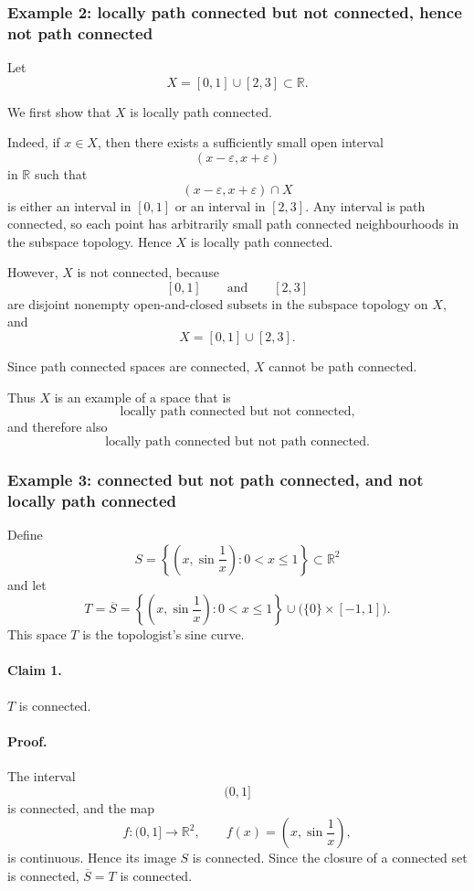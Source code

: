 \documentclass[12pt,a4paper]{article}
\theoremstyle{notespace}
\begin{document}
\subsubsection{Example 2: locally path connected but not connected, hence not path connected}

Let
\[
X=[0,1]\cup[2,3]\subset \mathbb{R}.
\]

We first show that \(X\) is locally path connected.

Indeed, if \(x\in X\), then there exists a sufficiently small open interval
\[
(x-\varepsilon,x+\varepsilon)
\]
in \(\mathbb{R}\) such that
\[
(x-\varepsilon,x+\varepsilon)\cap X
\]
is either an interval in \([0,1]\) or an interval in \([2,3]\). Any interval is path connected, so each point has arbitrarily small path connected neighbourhoods in the subspace topology. Hence \(X\) is locally path connected.

However, \(X\) is not connected, because
\[
[0,1]
\qquad\text{and}\qquad
[2,3]
\]
are disjoint nonempty open-and-closed subsets in the subspace topology on \(X\), and
\[
X=[0,1]\cup[2,3].
\]

Since path connected spaces are connected, \(X\) cannot be path connected.

Thus \(X\) is an example of a space that is
\[
\text{locally path connected but not connected,}
\]
and therefore also
\[
\text{locally path connected but not path connected.}
\]

\subsubsection{Example 3: connected but not path connected, and not locally path connected}

Define
\[
S=
\left\{
\left(x,\sin\frac{1}{x}\right):0<x\leq 1
\right\}\subset \mathbb{R}^2
\]
and let
\[
T=\overline{S}
=
\left\{
\left(x,\sin\frac{1}{x}\right):0<x\leq 1
\right\}
\cup
\bigl(\{0\}\times[-1,1]\bigr).
\]
This space \(T\) is the topologist's sine curve.

\paragraph{Claim 1.}
\(T\) is connected.

\paragraph{Proof.}
The interval
\[
(0,1]
\]
is connected, and the map
\[
f:(0,1]\to \mathbb{R}^2,
\qquad
f(x)=\left(x,\sin\frac{1}{x}\right),
\]
is continuous. Hence its image \(S\) is connected. Since the closure of a connected set is connected, \(\overline{S}=T\) is connected.
\end{document}
